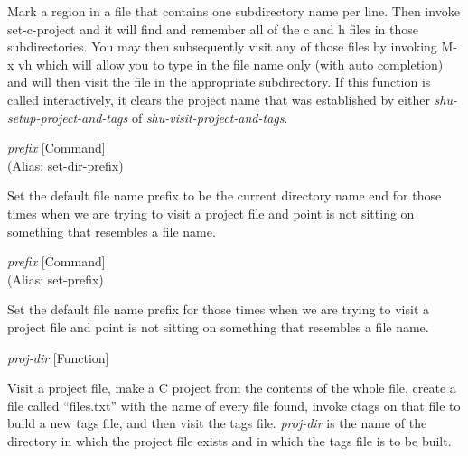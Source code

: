 \begin{doc-string}
Mark a region in a file that contains one subdirectory name per line.  Then
invoke set-c-project and it will find and remember all of the c and h files in
those subdirectories.  You may then subsequently visit any of those files by
invoking M-x vh which will allow you to type in the file name only (with auto
completion) and will then visit the file in the appropriate subdirectory.  If
this function is called interactively, it clears the project name that was
established by either \emph{shu-setup-project-and-tags} of \emph{shu-visit-project-and-tags}.
\end{doc-string}

\vspace{1em}
\noindent
{}
\usebox{\funcname}\emph{prefix}
 \hfill [Command]\\%
 (Alias: set-dir-prefix)

\begin{doc-string}
Set the default file name prefix to be the current directory name end for those
times when we are trying to visit a project file and point is not sitting on
something that resembles a file name.
\end{doc-string}

\vspace{1em}
\noindent
{}
\usebox{\funcname}\emph{prefix}
 \hfill [Command]\\%
 (Alias: set-prefix)

\begin{doc-string}
Set the default file name prefix for those times when we are trying to visit
a project file and point is not sitting on something that resembles a file name.
\end{doc-string}

\vspace{1em}
\noindent
{}
\usebox{\funcname}\emph{proj-dir}
 \hfill [Function]

\begin{doc-string}
Visit a project file, make a C project from the contents of the whole file,
create a file called ``files.txt'' with the name of every file found, invoke
ctags on that file to build a new tags file, and then visit the tags file.
\emph{proj-dir} is the name of the directory in which the project file exists and in
which the tags file is to be built.
\end{doc-string}

